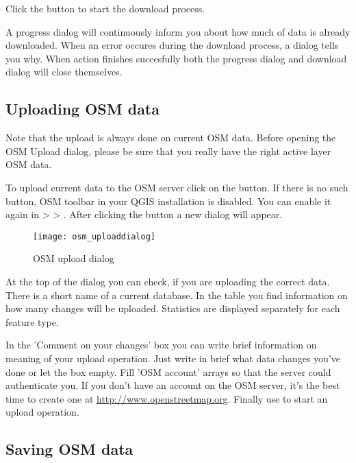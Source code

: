 Click the  button to start the download process.

A progress dialog will continuously inform you about how much of data is
already downloaded. When an error occures during the download process, a 
dialog tells you why. When action finishes succesfully both the progress dialog
and download dialog will close themselves.

\subsection{Uploading OSM data}  

Note that the upload is always done on current OSM data. Before opening the 
OSM Upload dialog, please be sure that you really have the right active 
layer ~ OSM data.

To upload current data to the OSM server click on the 
 button. If there is no such button, 
OSM toolbar in your QGIS installation is disabled. You can enable it 
again in  >  > 
. After clicking the  button a 
new dialog will appear.

\begin{figure}[ht]
   \begin{center}
   \caption{OSM upload dialog \nixcaption}\label{fig:osmupload}\smallskip
   \texttt{[image: osm\_uploaddialog]}
\end{center}
\end{figure}

At the top of the dialog you can check, if you are uploading the correct data. 
There is a short name of a current database. In the table you find information 
on how many changes will be uploaded. Statistics are displayed separately 
for each feature type.

In the 'Comment on your changes' box you can write brief information on 
meaning of your upload operation. Just write in brief what data changes 
you've done or let the box empty.
Fill 'OSM account' arrays so that the server could authenticate you. If 
you don't have an account on the OSM server, it's the best time to create 
one at \url{http://www.openstreetmap.org}. Finally use  to 
start an upload operation.

\subsection{Saving OSM data}  


